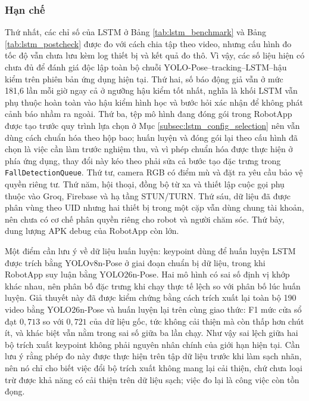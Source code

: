 \subsubsection{Hạn chế}

Thứ nhất, các chỉ số của LSTM ở Bảng \ref{tab:lstm_benchmark} và Bảng \ref{tab:lstm_postcheck} được đo với cách chia tập theo video, nhưng cấu hình đo tốc độ vẫn chưa lưu kèm log thiết bị và kết quả đo thô. Vì vậy, các số liệu hiện có chưa đủ để đánh giá độc lập toàn bộ chuỗi YOLO-Pose--tracking--LSTM--hậu kiểm trên phiên bản ứng dụng hiện tại. Thứ hai, số báo động giả vẫn ở mức 181,6 lần mỗi giờ ngay cả ở ngưỡng hậu kiểm tốt nhất, nghĩa là khối LSTM vẫn phụ thuộc hoàn toàn vào hậu kiểm hình học và bước hỏi xác nhận để không phát cảnh báo nhầm ra ngoài. Thứ ba, tệp mô hình đang đóng gói trong RobotApp được tạo trước quy trình lựa chọn ở Mục \ref{subsec:lstm_config_selection} nên vẫn dùng cách chuẩn hóa theo hộp bao; huấn luyện và đóng gói lại theo cấu hình đã chọn là việc cần làm trước nghiệm thu, và vì phép chuẩn hóa được thực hiện ở phía ứng dụng, thay đổi này kéo theo phải sửa cả bước tạo đặc trưng trong \texttt{FallDetectionQueue}. Thứ tư, camera RGB có điểm mù và đặt ra yêu cầu bảo vệ quyền riêng tư. Thứ năm, hội thoại, đồng bộ từ xa và thiết lập cuộc gọi phụ thuộc vào Groq, Firebase và hạ tầng STUN/TURN. Thứ sáu, dữ liệu đã được phân vùng theo UID nhưng hai thiết bị trong một cặp vẫn dùng chung tài khoản, nên chưa có cơ chế phân quyền riêng cho robot và người chăm sóc. Thứ bảy, dung lượng APK debug của RobotApp còn lớn.

Một điểm cần lưu ý về dữ liệu huấn luyện: keypoint dùng để huấn luyện LSTM được trích bằng YOLOv8n-Pose ở giai đoạn chuẩn bị dữ liệu, trong khi RobotApp suy luận bằng YOLO26n-Pose. Hai mô hình có sai số định vị khớp khác nhau, nên phân bố đặc trưng khi chạy thực tế lệch so với phân bố lúc huấn luyện. Giả thuyết này đã được kiểm chứng bằng cách trích xuất lại toàn bộ 190 video bằng YOLO26n-Pose và huấn luyện lại trên cùng giao thức: F1 mức cửa sổ đạt $0{,}713$ so với $0{,}721$ của dữ liệu gốc, tức không cải thiện mà còn thấp hơn chút ít, và khác biệt vẫn nằm trong sai số giữa ba lần chạy. Như vậy sai lệch giữa hai bộ trích xuất keypoint không phải nguyên nhân chính của giới hạn hiện tại. Cần lưu ý rằng phép đo này được thực hiện trên tập dữ liệu trước khi làm sạch nhãn, nên nó chỉ cho biết việc đổi bộ trích xuất không mang lại cải thiện, chứ chưa loại trừ được khả năng có cải thiện trên dữ liệu sạch; việc đo lại là công việc còn tồn đọng.

